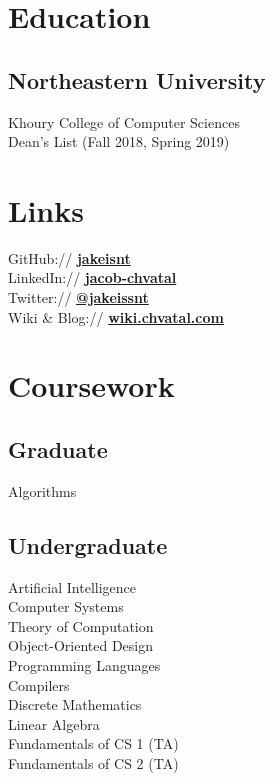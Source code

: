 \documentclass[letterpaper]{resume} %
\begin{document}
\begin{minipage}[t]{0.33\textwidth} %

\section{Education}
\subsection{Northeastern University}
Khoury College of Computer Sciences \\
Dean's List (Fall 2018, Spring 2019) \\
 \sectionspace %

\section{Links}
GitHub:// \href{https://github.com/jakeisnt}{\bf jakeisnt} \\
LinkedIn:// \href{https://www.linkedin.com/in/jacob-chvatal}{\bf jacob-chvatal} \\
Twitter:// \href{https://twitter.com/jakeissnt}{\bf @jakeissnt} \\
Wiki \& Blog:// \href{https://wiki.chvatal.com}{\bf wiki.chvatal.com} \\
\sectionspace

\section{Coursework}
\subsection{Graduate}
Algorithms
\sectionspace

\subsection{Undergraduate}
Artificial Intelligence \\
Computer Systems \\
Theory of Computation \\
Object-Oriented Design \\
Programming Languages \\
Compilers \\
Discrete Mathematics \\
Linear Algebra \\
Fundamentals of CS 1 (TA) \\
Fundamentals of CS 2 (TA) \\


\end{minipage}
\end{document}
